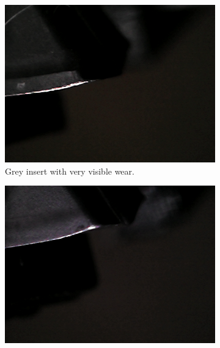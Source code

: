 \begin{figure}[hbtp]
	\centering
	\begin{subfigure}{0.31\textwidth}
		\includegraphics[width=\linewidth, keepaspectratio=true]{./fig/Vision/Dataset/automated_datasets/2_created_datasets/2_Spaghetti_dataset/gray_b_003_p_004_l_006-011_white_nb.png}
		\caption{Grey insert with very visible wear.}
		\label{fig:impl:datasets:spaghetti:grey}
	\end{subfigure}
	\hspace*{\fill}
	\begin{subfigure}{0.31\textwidth}
		\includegraphics[width=\linewidth, keepaspectratio=true]{./fig/Vision/Dataset/automated_datasets/2_created_datasets/2_Spaghetti_dataset/rounded_grey_b_011_p_008_l_006-011_white_nb.png}

\end{subfigure}
\end{figure}
